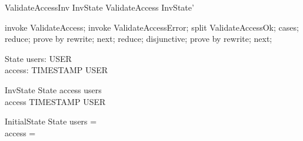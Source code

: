\begin{theorem}{ValidateAccessInv}
    InvState \land ValidateAccess \implies InvState'
\end{theorem}

\begin{zproof}
    invoke ValidateAccess;
    invoke ValidateAccessError;
    split ValidateAccessOk;
    cases;
    reduce;
    prove by rewrite;
    next;
    reduce;
    disjunctive;
    prove by rewrite;
    next;
\end{zproof}

\begin{schema}{State}
    users: \power USER \\
    access: TIMESTAMP \rel USER
\end{schema}

\begin{schema}{InvState}
    State
    \where
    \dom access \subseteq users \\
    access \in TIMESTAMP \pfun USER
\end{schema}

\begin{schema}{InitialState}
    State
    \where
    users = \emptyset \\
    access = \emptyset
\end{schema}
